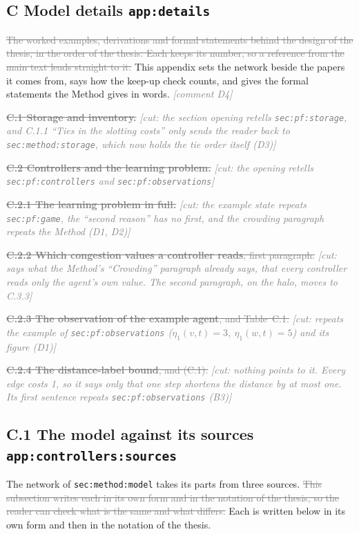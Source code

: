 \documentclass[11pt,a4paper]{article}
\newcommand{\new}[1]{\textcolor{newc}{#1}}
\newcommand{\old}[1]{\textcolor{gray}{\sout{#1}}}
\newcommand{\lref}[1]{{\small\texttt{#1}}}
\newcommand{\cmt}[1]{{\small\textcolor{gray}{\emph{[comment #1]}}}}
\newcommand{\cut}[1]{{\small\textcolor{gray}{\emph{[cut: #1]}}}}
\begin{document}
\subsection*{C \quad Model details \hfill\lref{app:details}}

\old{The worked examples, derivations and formal statements behind the design
of the thesis, in the order of the thesis. Each keeps its number, so a
reference from the main text leads straight to it.}
\new{This appendix sets the network beside the papers it comes from, says how
the keep-up check counts, and gives the formal statements the Method gives
in words.} \hfill\cmt{D4}

\old{\textbf{C.1 Storage and inventory.}} \cut{the section opening retells
\lref{sec:pf:storage}, and C.1.1 ``Ties in the slotting costs'' only sends
the reader back to \lref{sec:method:storage}, which now holds the tie order
itself (D3)}

\old{\textbf{C.2 Controllers and the learning problem.}} \cut{the opening
retells \lref{sec:pf:controllers} and \lref{sec:pf:observations}}

\old{\textbf{C.2.1 The learning problem in full.}} \cut{the example state
repeats \lref{sec:pf:game}, the ``second reason'' has no first, and the
crowding paragraph repeats the Method (D1, D2)}

\old{\textbf{C.2.2 Which congestion values a controller reads}, first
paragraph.} \cut{says what the Method's ``Crowding'' paragraph already says,
that every controller reads only the agent's own value. The second paragraph,
on the halo, moves to C.3.3}

\old{\textbf{C.2.3 The observation of the example agent}, and Table~C.1.}
\cut{repeats the example of \lref{sec:pf:observations} ($\eta_1(v,t)=3$,
$\eta_1(w,t)=5$) and its figure (D1)}

\old{\textbf{C.2.4 The distance-label bound}, and (C.1).} \cut{nothing points
to it. Every edge costs 1, so it says only that one step shortens the
distance by at most one. Its first sentence repeats
\lref{sec:pf:observations} (B3)}

\subsection*{C.1 \quad The model against its sources \hfill\lref{app:controllers:sources}}

The network of \lref{sec:method:model} takes its parts from three sources.
\old{This subsection writes each in its own form and in the notation of the
thesis, so the reader can check what is the same and what differs.}
\new{Each is written below in its own form and then in the notation of the
thesis.}
\end{document}
